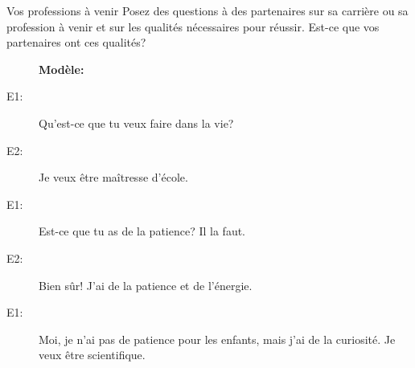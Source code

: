 \begin{frame}{Vos professions à venir}
  Posez des questions à des partenaires sur sa carrière ou sa profession à venir  et sur les qualités nécessaires pour réussir.
  Est-ce que vos partenaires ont ces qualités?
  \begin{description}
    \item[] \textbf{Modèle:}
    \item[E1:] Qu'est-ce que tu veux faire dans la vie?
    \item[E2:] Je veux être maîtresse d'école.
    \item[E1:] Est-ce que tu as \alert{de la} patience? Il la faut.
    \item[E2:] Bien sûr! J'ai \alert{de la} patience et \alert{de l'}énergie.
    \item[E1:] Moi, je n'ai pas \alert{de} patience pour les enfants, mais j'ai \alert{de la curiosité}. Je veux être scientifique.
  \end{description}
\end{frame}